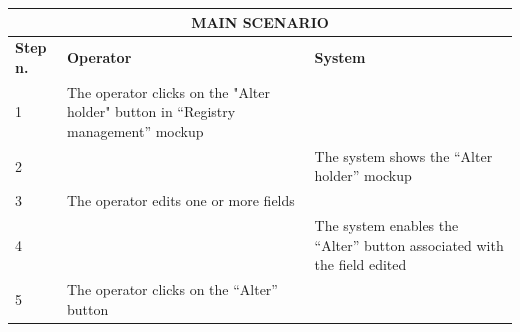 {{{\begin{center}
			\begin{tabular}{|p{2cm}|p{6cm}|p{6cm}|}
			\hline
				\multicolumn{3}{|c|}{MAIN SCENARIO} \\
			\hline
				\centering \vspace{1mm} \bfseries{Step n.} \vspace{1mm} & \vspace{1mm} \bfseries{Operator} \vspace{1mm} & \vspace{1mm} \bfseries{System} \vspace{1mm}\\
			\hline
				\vspace{1mm} 1 \vspace{1mm} &
				\vspace{1mm} The operator clicks on the "Alter holder" button in “Registry management” mockup \vspace{1mm} & 
				\vspace{1mm} \vspace{1mm} \\
			\hline
				\vspace{1mm} 2 \vspace{1mm} &
				\vspace{1mm} \vspace{1mm} & 
				\vspace{1mm} The system shows the “Alter holder” mockup \vspace{1mm} \\
			\hline
				\vspace{1mm} 3 \vspace{1mm} &
				\vspace{1mm} The operator edits one or more fields \vspace{1mm} & 
				\vspace{1mm} \vspace{1mm} \\
			\hline
				\vspace{1mm} 4 \vspace{1mm} &
				\vspace{1mm} \vspace{1mm} & 
				\vspace{1mm} The system enables the “Alter” button associated with the field edited\vspace{1mm} \\
			\hline
				\vspace{1mm} 5 \vspace{1mm} &
				\vspace{1mm} The operator clicks on the “Alter” button\vspace{1mm} & 

\end{tabular}
\end{center}}}}
